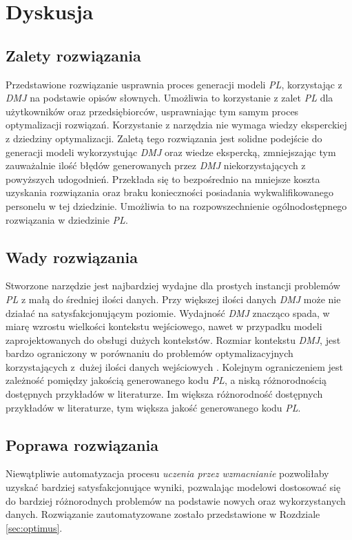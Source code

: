 
\chapter{Dyskusja}\label{ch:discussion}

\section{Zalety rozwiązania}

Przedstawione rozwiązanie usprawnia proces generacji modeli \textit{PL}, korzystając z \textit{DMJ} na podstawie opisów słownych. Umożliwia to korzystanie z zalet \textit{PL} dla użytkowników oraz przedsiębiorców, usprawniając tym samym proces optymalizacji rozwiązań. Korzystanie z narzędzia nie wymaga wiedzy eksperckiej z dziedziny optymalizacji. Zaletą tego rozwiązania jest solidne podejście do generacji modeli wykorzystując \textit{DMJ} oraz wiedze ekspercką, zmniejszając tym zauważalnie ilość błędów generowanych przez \textit{DMJ} niekorzystających z powyższych udogodnień. Przekłada się to bezpośrednio na mniejsze koszta uzyskania rozwiązania oraz braku konieczności posiadania wykwalifikowanego personelu w tej dziedzinie. Umożliwia to na rozpowszechnienie ogólnodostępnego rozwiązania w dziedzinie \textit{PL}. 

\section{Wady rozwiązania}
Stworzone narzędzie jest najbardziej wydajne dla prostych instancji problemów \textit{PL} z małą do średniej ilości danych. Przy większej ilości danych \textit{DMJ} może nie działać na satysfakcjonującym poziomie. Wydajność \textit{DMJ} znacząco spada, w miarę wzrostu wielkości kontekstu wejściowego, nawet w przypadku modeli zaprojektowanych do obsługi dużych kontekstów. Rozmiar kontekstu \textit{DMJ}, jest bardzo ograniczony w porównaniu do problemów optymalizacyjnych korzystających z~dużej ilości danych wejściowych \cite{10.1162/tacl_a_00638}. Kolejnym ograniczeniem jest zależność pomiędzy jakością generowanego kodu \textit{PL}, a niską różnorodnością dostępnych przykładów w literaturze. Im większa różnorodność dostępnych przykładów w literaturze, tym większa jakość generowanego kodu \textit{PL}.

\section{Poprawa rozwiązania}
Niewątpliwie automatyzacja procesu \textit{uczenia przez wzmacnianie} pozwoliłaby uzyskać bardziej satysfakcjonujące wyniki, pozwalając modelowi dostosować się do bardziej różnorodnych problemów na podstawie nowych oraz wykorzystanych danych. Rozwiązanie zautomatyzowane zostało przedstawione w Rozdziale \ref{sec:optimus}. 

